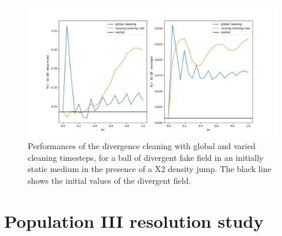 \documentclass[11pt]{article}
\begin{document}
\begin{figure}[h!]
         \centering
		\includegraphics[width=18cm]{divB_static.png}
		\caption{Performances of the \cite{Dedner2002} divergence cleaning with global and varied cleaning timesteps, for a ball of divergent fake field in an initially static medium in the presence of a X2 density jump. The black line shows the initial values of the divergent field.}
		\label{fig:static}
\end{figure}

\section{Population III resolution study}
\label{sub:popIIIme}
\end{document}
